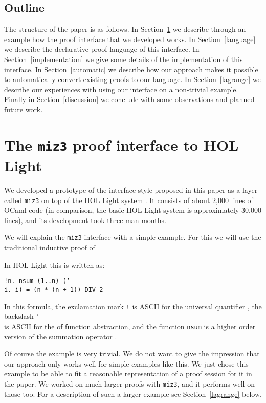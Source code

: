 \documentclass{LMCS}
\let\xmedskip=\medskip
\def\lam{\char`\\}
\def\}{\char`\}}
\begin{document}
\subsection{Outline}

\noindent
The structure of the paper is as follows.
In Section~\ref{session} we describe through an example how the proof interface that
we developed works.
In Section~\ref{language} we describe the declarative proof language of this interface.
In Section~\ref{implementation} we give some details of the implementation of this
interface.
In Section~\ref{automatic} we describe how our approach makes it possible
to automatically convert existing proofs to our language.
In Section~\ref{lagrange} we describe our experiences with using our interface
on a non-trivial example.
Finally in Section~\ref{discussion} we conclude with some observations and
planned future work.


\section{The \texttt{miz3} proof interface to HOL Light}\label{session}

\noindent
We developed a prototype of the interface style proposed
in this paper as a layer called
\texttt{miz3} on top of the HOL Light system \cite{har:xx,har:00}.
It consists of about 2,000 lines of OCaml code (in comparison,
the basic HOL Light system is approximately 30,000 lines), and its
development took 
three man months.

We will explain the \texttt{miz3} interface with a simple
example.
For this we will use the traditional inductive proof of

In HOL Light this is written as:
\xmedskip
\begin{center}\small
\texttt{!n.\ nsum (1..n) ({\lam}i.\ i) = (n * (n + 1)) DIV 2}
\end{center}
\xmedskip
In this formula, the exclamation mark \texttt{!} is ASCII for the universal
quantifier , the backslash \texttt{\lam} is ASCII for the
 of function abstraction,
and the function \texttt{nsum} is a higher order version of the summation operator .

Of course the example is very trivial.
We do not want to give the impression that our approach only works well
for simple examples like this.
We just chose this example to be able to fit a reasonable representation
of a proof session for it in the paper.
We worked on much larger proofs with \texttt{miz3},
and it performs well on those too.
For a description of such a larger example see Section~\ref{lagrange} below.
\end{document}
